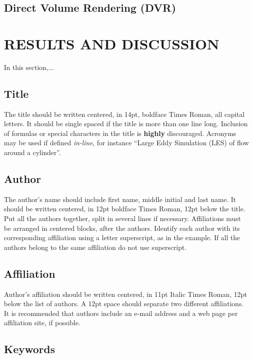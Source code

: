 \documentclass[oneside,a4paper,english,links]{amca}
\begin{document}
\subsection{Direct Volume Rendering (DVR)}

\section{RESULTS AND DISCUSSION}

In this section,...



\subsection{Title}

The title should be written centered, in 14pt, boldface Times Roman,
all capital letters. It should be single spaced if the title is more
than one line long. Inclusion of formulas or special characters in the
title is \textbf{highly} discouraged. Acronyms may be used if defined
\emph{in-line}, for instance ``Large Eddy Simulation (LES) of
flow around a cylinder''.

\subsection{Author}

The author's name should include first name, middle initial and last
name. It should be written centered, in 12pt boldface Times Roman,
12pt below the title. Put all the authors together, split in several
lines if necessary. Affiliations must be arranged in centered blocks,
after the authors. Identify each author with its corresponding
affiliation using a letter superscript, as in the example. If all the
authors belong to the same affiliation do not use superscript. 

\subsection{Affiliation}

Author's affiliation should be written centered, in 11pt Italic Times Roman,
12pt below the list of authors. A 12pt space should separate two
different affiliations. It is recommended that authors include an
e-mail address and a web page per affiliation site, if possible. 

\subsection{Keywords}
\end{document}
